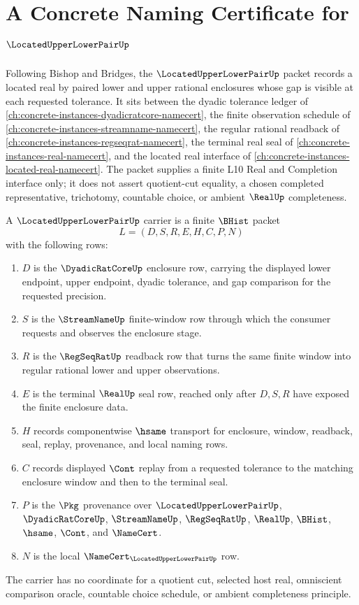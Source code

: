 \chapter{A Concrete Naming Certificate for $\LocatedUpperLowerPairUp$}
\label{ch:concrete-instances-located-upper-lower-pair-namecert}

Following Bishop and Bridges, the $\LocatedUpperLowerPairUp$ packet records a located real by paired lower and upper rational enclosures whose gap is visible at each requested tolerance. It sits between the dyadic tolerance ledger of \autoref{ch:concrete-instances-dyadicratcore-namecert}, the finite observation schedule of \autoref{ch:concrete-instances-streamname-namecert}, the regular rational readback of \autoref{ch:concrete-instances-regseqrat-namecert}, the terminal real seal of \autoref{ch:concrete-instances-real-namecert}, and the located real interface of \autoref{ch:concrete-instances-located-real-namecert}. The packet supplies a finite L10 Real and Completion interface only; it does not assert quotient-cut equality, a chosen completed representative, trichotomy, countable choice, or ambient $\RealUp$ completeness.

\begin{definition}
\label{def:located-upper-lower-pair-carrier}
A $\LocatedUpperLowerPairUp$ carrier is a finite $\BHist$ packet
$$
L=(D,S,R,E,H,C,P,N)
$$
with the following rows:
\begin{enumerate}
\item $D$ is the $\DyadicRatCoreUp$ enclosure row, carrying the displayed lower endpoint, upper endpoint, dyadic tolerance, and gap comparison for the requested precision.
\item $S$ is the $\StreamNameUp$ finite-window row through which the consumer requests and observes the enclosure stage.
\item $R$ is the $\RegSeqRatUp$ readback row that turns the same finite window into regular rational lower and upper observations.
\item $E$ is the terminal $\RealUp$ seal row, reached only after $D,S,R$ have exposed the finite enclosure data.
\item $H$ records componentwise $\hsame$ transport for enclosure, window, readback, seal, replay, provenance, and local naming rows.
\item $C$ records displayed $\Cont$ replay from a requested tolerance to the matching enclosure window and then to the terminal seal.
\item $P$ is the $\Pkg$ provenance over $\LocatedUpperLowerPairUp$, $\DyadicRatCoreUp$, $\StreamNameUp$, $\RegSeqRatUp$, $\RealUp$, $\BHist$, $\hsame$, $\Cont$, and $\NameCert$.
\item $N$ is the local $\NameCert_{\LocatedUpperLowerPairUp}$ row.
\end{enumerate}
The carrier has no coordinate for a quotient cut, selected host real, omniscient comparison oracle, countable choice schedule, or ambient completeness principle.
\end{definition}

